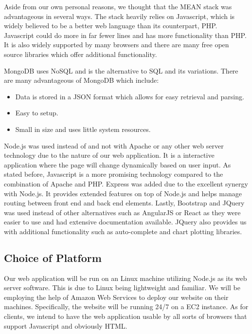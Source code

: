 \documentclass[11pt]{article}
\numberwithin{figure}{section}
\begin{document}
        \bigskip
        \noindent
        Aside from our own personal reasons, we thought that the MEAN stack was advantageous in several ways. The stack heavily relies on Javascript, which is widely believed to be a better web language than its counterpart, PHP. Javascript could do more in far fewer lines and has more functionality than PHP. It is also widely supported by many browsers and there are many free open source libraries which offer additional functionality.
        
        \bigskip
        \noindent
        MongoDB uses NoSQL and is the alternative to SQL and its variations. There are many advantageous of MongoDB which include:
        \begin{itemize}
            \item Data is stored in a JSON format which allows for easy retrieval and parsing.
            \item Easy to setup.
            \item Small in size and uses little system resources.
        \end{itemize}
        
        \bigskip
        \noindent
        Node.js was used instead of and not with Apache or any other web server technology due to the nature of our web application. It is a interactive application where the page will change dynamically based on user input. As stated before, Javascript is a more promising technology compared to the combination of Apache and PHP. Express was added due to the excellent synergy with Node.js. It provides extended features on top of Node.js and helps manage routing between front end and back end elements.
        \bigskip
        \noindent
        Lastly, Bootstrap and JQuery was used instead of other alternatives such as AngularJS or React as they were easier to use and had extensive documentation available. JQuery also provides us with additional functionality such as auto-complete and chart plotting libraries.

    \subsection{Choice of Platform}
        Our web application will be run on an Linux machine utilizing Node.js as its web server software. This is due to Linux being lightweight and familiar. We will be employing the help of Amazon Web Services to deploy our website on their machines. Specifically, the website will be running 24/7 on a EC2 instance. As for clients, we intend to have the web application usable by all sorts of browsers that support Javascript and obviously HTML.
        
\end{document}
